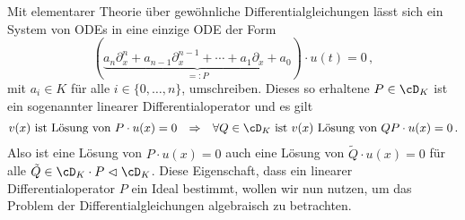 Mit elementarer Theorie über gewöhnliche Differentialgleichungen lässt sich
ein System von ODEs in eine einzige ODE der Form
\begin{equation} \label{eq:UmgeformteODE}
(\underset{=:P}{\underbrace{ a_n\partial_x^n + a_{n-1}\partial_x^{n-1} +
\cdots + a_1\partial_x + a_0}})\cdot u(t)=0 \,,
\end{equation}
mit $a_i\in K$ für alle $i\in\{0,\dots,n\}$, umschreiben. Dieses so erhaltene
$P\in\cD_K$ ist ein sogenannter linearer Differentialoperator und es gilt
\begin{align*}
v(x) \text{ ist Lösung von } P\cdot u(x)=0
&&\Rightarrow && \forall Q\in \cD_K \text{ ist } v(x) \text{ Lösung von }
QP\cdot u(x)=0 \,.
\end{align*}
Also ist eine Lösung von $P\cdot u(x)=0$ auch eine Lösung von $\tilde Q\cdot
u(x)=0$ für alle $\tilde Q\in\cD_K\cdot P\vartriangleleft \cD_K$.
Diese Eigenschaft, dass ein linearer Differentialoperator $P$ ein Ideal
bestimmt, wollen wir nun nutzen, um das Problem der Differentialgleichungen
algebraisch zu betrachten.

\begin{comment}
Sei $P$ ein linearer Differentialoperator mit Koeffizienten in $a_i(x)\in\Ckx$
geschrieben als $P=\sum^{d}_{i=0}{a_{i}(x)\partial_x^i}$.
Man sagt eine Funktion $u\in\cF$ ist Lösung von $P$, falls $u$ die Gleichung
$Pu=0$ erfüllt.
Man sagt $0$ ist ein singulärer Punkt falls $a_d(0)=0$.
Falls $0$ kein singulärer Punkt ist, hat $P$ genau $d$ über $\C$ Unabhängige
Lösungen in $\Ckx$. %
\end{comment}

